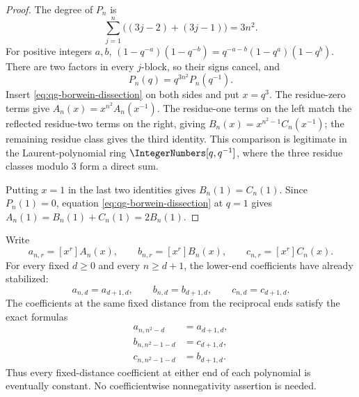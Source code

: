 \begin{proof}
The degree of \(P_n\) is
\[
 \sum_{j=1}^{n}\bigl((3j-2)+(3j-1)\bigr)=3n^2.
\]
For positive integers \(a,b\),
\((1-q^{-a})(1-q^{-b})=q^{-a-b}(1-q^a)(1-q^b)\).
There are two factors in every \(j\)-block, so their signs cancel, and
\[
 P_n(q)=q^{3n^2}P_n(q^{-1}).
\]
Insert \eqref{eq:qg-borwein-dissection} on both sides and put \(x=q^3\).
The residue-zero terms give
\(A_n(x)=x^{n^2}A_n(x^{-1})\).  The residue-one terms on the left match the
reflected residue-two terms on the right, giving
\(B_n(x)=x^{n^2-1}C_n(x^{-1})\); the remaining residue class gives the third
identity.  This comparison is legitimate in the Laurent-polynomial ring
\(\IntegerNumbers[q,q^{-1}]\), where the three residue classes modulo \(3\)
form a direct sum.

Putting \(x=1\) in the last two identities gives \(B_n(1)=C_n(1)\).  Since
\(P_n(1)=0\), equation \eqref{eq:qg-borwein-dissection} at \(q=1\) gives
\(A_n(1)=B_n(1)+C_n(1)=2B_n(1)\).
\end{proof}

\begin{proposition}
\label{qg:prop-borwein-tail-stabilization}
Write
\[
 a_{n,r}=[x^r]A_n(x),
 \qquad
 b_{n,r}=[x^r]B_n(x),
 \qquad
 c_{n,r}=[x^r]C_n(x).
\]
For every fixed \(d\ge0\) and every \(n\ge d+1\), the lower-end
coefficients have already stabilized:
\[
 a_{n,d}=a_{d+1,d},
 \qquad
 b_{n,d}=b_{d+1,d},
 \qquad
 c_{n,d}=c_{d+1,d}.
\]
The coefficients at the same fixed distance from the reciprocal ends satisfy
the exact formulas
\begin{align}
 a_{n,n^2-d}&=a_{d+1,d},\\
 b_{n,n^2-1-d}&=c_{d+1,d},\\
 c_{n,n^2-1-d}&=b_{d+1,d}.
\label{eq:qg-borwein-tail-stabilization}
\end{align}
Thus every fixed-distance coefficient at either end of each polynomial is
eventually constant.  No coefficientwise nonnegativity assertion is needed.
\end{proposition}

